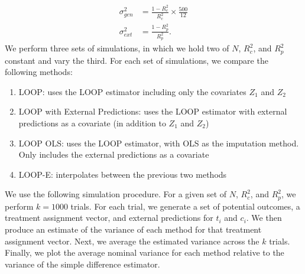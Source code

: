 \begin{align*}
\sigma^2_{gen} &= \frac{1-R_c^2}{R_c^2}\times\frac{500}{12} \\
\sigma^2_{ext} &= \frac{1 - R^2_{p}}{R_p^2} .
\end{align*}
We perform three sets of simulations, in which we hold two of $N$, $R_c^2$, and $R^2_{p}$ constant and vary the third.  For each set of simulations, we compare the following methods:
\begin{enumerate}
	\item LOOP: uses the LOOP estimator including only the covariates $Z_1$ and $Z_2$
	\item LOOP with External Predictions: uses the LOOP estimator with external predictions as a covariate (in addition to $Z_1$ and $Z_2$)
	\item LOOP OLS: uses the LOOP estimator, with OLS as the imputation method. Only includes the external predictions as a covariate
	\item LOOP-E: interpolates between the previous two methods
\end{enumerate}
\noindent
We use the following simulation procedure. For a given set of $N$, $R_c^2$, and $R^2_{p}$, we perform $k = 1000$ trials. For each trial, we generate a set of potential outcomes, a treatment assignment vector, and external predictions for $t_i$ and $c_i$. We then produce an estimate of the variance of each method for that treatment assignment vector. Next, we average the estimated variance across the $k$ trials. Finally, we plot the average nominal variance for each method relative to the variance of the simple difference estimator.

